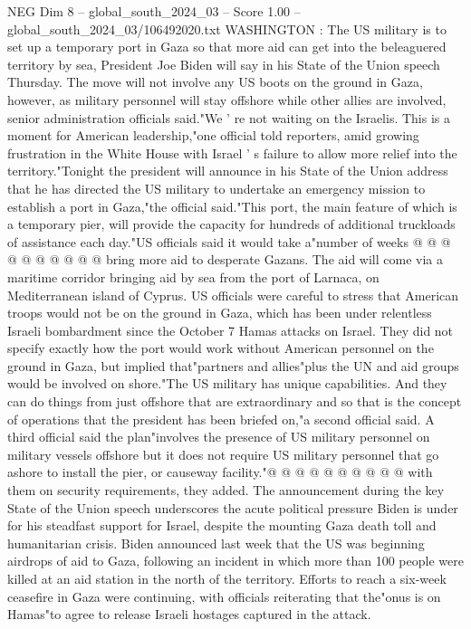 \begin{textsample}{NEG Dim 8 – global\_south\_2024\_03 – Score 1.00 – global\_south\_2024\_03/106492020.txt}  \label{ex:f8_neg_365}
WASHINGTON : The US military is to set up a temporary port in Gaza so that more aid can get into the beleaguered territory by sea, President Joe Biden will say in his State of the Union speech Thursday.
The move will not involve any US boots on the ground in Gaza, however, as military personnel will stay offshore while other allies are involved, senior administration officials said."We ' re not waiting on the Israelis.
This is a moment for American leadership,"one official told reporters, amid growing frustration in the White House with Israel ' s failure to allow more relief into the territory."Tonight the president will announce in his State of the Union address that he has directed the US military to undertake an emergency mission to establish a port in Gaza,"the official said."This port, the main feature of which is a temporary pier, will provide the capacity for hundreds of additional truckloads of assistance each day."US officials said it would take a"number of weeks @ @ @ @ @ @ @ @ @ @ bring more aid to desperate Gazans.
The aid will come via a maritime corridor bringing aid by sea from the port of Larnaca, on Mediterranean island of Cyprus.
US officials were careful to stress that American troops would not be on the ground in Gaza, which has been under relentless Israeli bombardment since the October 7 Hamas attacks on Israel.
They did not specify exactly how the port would work without American personnel on the ground in Gaza, but implied that"partners and allies"plus the UN and aid groups would be involved on shore."The US military has unique capabilities.
And they can do things from just offshore that are extraordinary and so that is the concept of operations that the president has been briefed on,"a second official said.
A third official said the plan"involves the presence of US military personnel on military vessels offshore but it does not require US military personnel that go ashore to install the pier, or causeway facility."@ @ @ @ @ @ @ @ @ @ with them on security requirements, they added.
The announcement during the key State of the Union speech underscores the acute political pressure Biden is under for his steadfast support for Israel, despite the mounting Gaza death toll and humanitarian crisis.
Biden announced last week that the US was beginning airdrops of aid to Gaza, following an incident in which more than 100 people were killed at an aid station in the north of the territory.
Efforts to reach a six-week ceasefire in Gaza were continuing, with officials reiterating that the"onus is on Hamas"to agree to release Israeli hostages captured in the attack.

\end{textsample}
